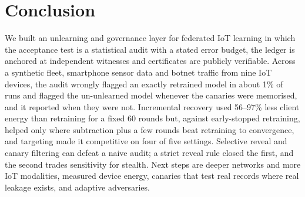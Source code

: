 \documentclass[journal]{IEEEtran}
\begin{document}
\section{Conclusion}
We built an unlearning and governance layer for federated IoT learning in which the acceptance test is a statistical audit with a stated error budget, the ledger is anchored at independent witnesses and certificates are publicly verifiable. Across a synthetic fleet, smartphone sensor data and botnet traffic from nine IoT devices, the audit wrongly flagged an exactly retrained model in about 1\% of runs and flagged the un-unlearned model whenever the canaries were memorised, and it reported when they were not. Incremental recovery used 56--97\% less client energy than retraining for a fixed 60 rounds but, against early-stopped retraining, helped only where subtraction plus a few rounds beat retraining to convergence, and targeting made it competitive on four of five settings. Selective reveal and canary filtering can defeat a naive audit; a strict reveal rule closed the first, and the second trades sensitivity for stealth. Next steps are deeper networks and more IoT modalities, measured device energy, canaries that test real records where real leakage exists, and adaptive adversaries.
\end{document}
